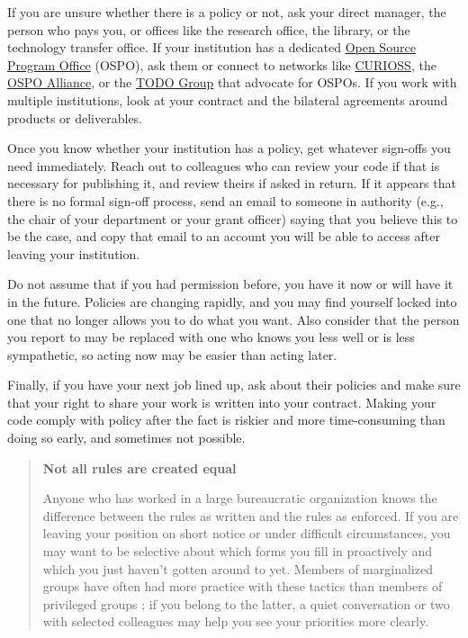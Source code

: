 \documentclass[10pt,letterpaper]{article}
\begin{document}
If you are unsure whether there is a policy or not,
ask your direct manager,
the person who pays you,
or offices like the research office,
the library,
or the technology transfer office.
If your institution has a dedicated
\href{https://sustainoss.org/academic-map/universities/index.html}{Open Source Program Office} (OSPO),
ask them
or connect to networks like \href{https://curioss.org}{CURIOSS},
the \href{https://ospo-alliance.org/}{OSPO Alliance},
or the \href{https://todogroup.org/}{TODO Group}
that advocate for OSPOs.
If you work with multiple institutions,
look at your contract and the bilateral agreements around products or deliverables.

Once you know whether your institution has a policy,
get whatever sign-offs you need immediately.
Reach out to colleagues who can review your code if that is necessary for publishing it,
and review theirs if asked in return.
If it appears that there is no formal sign-off process,
send an email to someone in authority
(e.g., the chair of your department or your grant officer)
saying that you believe this to be the case,
and copy that email to an account you will be able to access
after leaving your institution.

Do not assume that if you had permission before,
you have it now or will have it in the future.
Policies are changing rapidly,
and you may find yourself locked into one that no longer allows you to do what you want.
Also consider that the person you report to may be replaced with one who knows you less well or is less sympathetic,
so acting now may be easier than acting later.

Finally,
if you have your next job lined up,
ask about their policies
and make sure that your right to share your work is written into your contract.
Making your code comply with policy after the fact is riskier and more time-consuming than doing so early,
and sometimes not possible.

\begin{quote}
  \noindent
  \textbf{Not all rules are created equal}

  Anyone who has worked in a large bureaucratic organization knows
  the difference between the rules as written and the rules as enforced.
  If you are leaving your position on short notice or under difficult circumstances,
  you may want to be selective about which forms you fill in proactively
  and which you just haven't gotten around to yet.
  Members of marginalized groups have often had more practice with these tactics
  than members of privileged groups \cite{Scott1987};
  if you belong to the latter,
  a quiet conversation or two with selected colleagues may help you see your priorities more clearly.
\end{quote}
\end{document}
